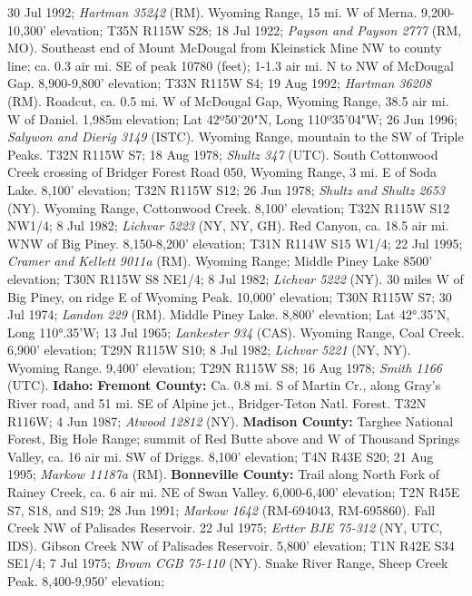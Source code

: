 30 Jul 1992; \textit{Hartman 35242} (RM).
Wyoming Range, 15 mi. W of Merna. 9,200-10,300' elevation; T35N R115W S28;
18 Jul 1922; \textit{Payson and Payson 2777} (RM, MO).
Southeast end of Mount McDougal from Kleinstick Mine NW to county line; ca. 0.3
air mi. SE of peak 10780 (feet); 1-1.3 air mi. N to NW of McDougal Gap.
8,900-9,800' elevation; T33N R115W S4; 19 Aug 1992; \textit{Hartman 36208} (RM).
Roadcut, ca. 0.5 mi. W of McDougal Gap, Wyoming Range, 38.5 air mi. W of Daniel.
1,985m elevation; Lat 42º50'20"N, Long 110º35'04"W; 26 Jun 1996;
\textit{Salywon and Dierig 3149} (ISTC).
Wyoming Range, mountain to the SW of Triple Peaks. T32N R115W S7; 18 Aug 1978;
\textit{Shultz 347} (UTC).
South Cottonwood Creek crossing of Bridger Forest Road 050, Wyoming Range,
3 mi. E of Soda Lake. 8,100' elevation; T32N R115W S12; 26 Jun 1978;
\textit{Shultz and Shultz 2653} (NY).
Wyoming Range, Cottonwood Creek. 8,100' elevation; T32N R115W S12 NW1/4;
8 Jul 1982; \textit{Lichvar 5223} (NY, NY, GH).
Red Canyon, ca. 18.5 air mi. WNW of Big Piney. 8,150-8,200' elevation;
T31N R114W S15 W1/4; 22 Jul 1995; \textit{Cramer and Kellett 9011a} (RM).
Wyoming Range; Middle Piney Lake 8500' elevation; T30N R115W S8 NE1/4;
8 Jul 1982; \textit{Lichvar 5222} (NY).
30 miles W of Big Piney, on ridge E of Wyoming Peak. 10,000' elevation;
T30N R115W S7; 30 Jul 1974; \textit{Landon 229} (RM).
Middle Piney Lake. 8,800' elevation; Lat 42°.35'N, Long 110°.35’W; 13 Jul 1965;
\textit{Lankester 934} (CAS).
Wyoming Range, Coal Creek. 6,900' elevation; T29N R115W S10; 8 Jul 1982;
\textit{Lichvar 5221} (NY, NY).
Wyoming Range. 9,400' elevation; T29N R115W S8; 16 Aug 1978;
\textit{Smith 1166} (UTC).
  \textbf{Idaho:}
  \textbf{Fremont County:}
Ca. 0.8 mi. S of Martin Cr., along Gray's River road, and 51 mi. SE of
Alpine jct., Bridger-Teton Natl. Forest. T32N R116W; 4 Jun 1987;
\textit{Atwood 12812} (NY).
  \textbf{Madison County:}
Targhee National Forest, Big Hole Range; summit of Red Butte above and W of
Thousand Springs Valley, ca. 16 air mi. SW of Driggs. 8,100' elevation;
T4N R43E S20; 21 Aug 1995; \textit{Markow 11187a} (RM).
  \textbf{Bonneville County:}
Trail along North Fork of Rainey Creek, ca. 6 air mi. NE of Swan Valley.
6,000-6,400' elevation; T2N R45E S7, S18, and S19; 28 Jun 1991;
\textit{Markow 1642} (RM-694043, RM-695860).
Fall Creek NW of Palisades Reservoir. 22 Jul 1975;
\textit{Ertter BJE 75-312} (NY, UTC, IDS).
Gibson Creek NW of Palisades Reservoir. 5,800' elevation; T1N R42E S34 SE1/4;
7 Jul 1975; \textit{Brown CGB 75-110} (NY).
Snake River Range, Sheep Creek Peak. 8,400-9,950' elevation;
